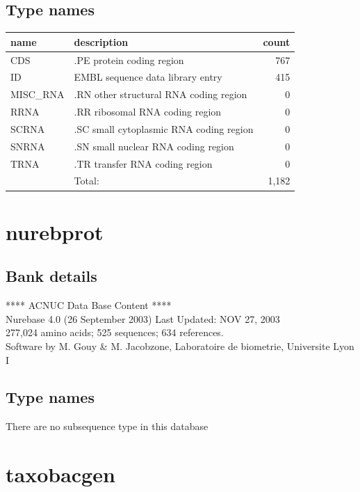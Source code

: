 \documentclass{article}
\begin{document}
\begin{Schunk}
\subsection{Type names}
\noindent\begin{tabular}{llr}
\hline \hline
name & description & count \\
\hline
CDS  &  .PE protein coding region  &  767 \\
ID  &  EMBL sequence data library entry  &  415 \\
MISC\_RNA  &  .RN other structural RNA coding region  &  0 \\
RRNA  &  .RR ribosomal RNA coding region  &  0 \\
SCRNA  &  .SC small cytoplasmic RNA coding region  &  0 \\
SNRNA  &  .SN small nuclear RNA coding region  &  0 \\
TRNA  &  .TR transfer RNA coding region  &  0 \\
\hline
 & Total: & 1,182 \\
\hline \hline
\end{tabular}

\section{ nurebprot }
\subsection{Bank details}
             ****     ACNUC Data Base Content      ****                         \\
         Nurebase 4.0 (26 September 2003) Last Updated: NOV 27, 2003\\
          277,024 amino acids; 525 sequences; 634 references.\\
Software by M. Gouy \& M. Jacobzone, Laboratoire de biometrie, Universite Lyon I 

\subsection{Type names}
There are no subsequence type in this database
\section{ taxobacgen }

\end{Schunk}
\end{document}
